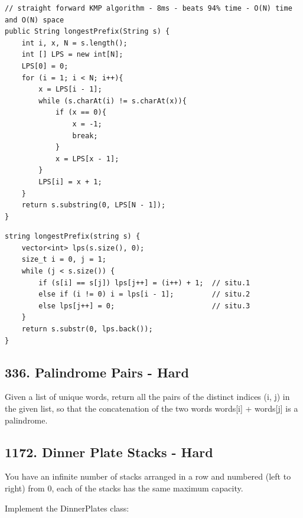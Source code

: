 \documentclass[9pt, b5paaper]{book}
\begin{document}
\begin{enumerate}
\begin{verbatim}
// straight forward KMP algorithm - 8ms - beats 94% time - O(N) time and O(N) space
public String longestPrefix(String s) {
    int i, x, N = s.length();
    int [] LPS = new int[N];
    LPS[0] = 0;
    for (i = 1; i < N; i++){
        x = LPS[i - 1];
        while (s.charAt(i) != s.charAt(x)){
            if (x == 0){
                x = -1;
                break;
            }
            x = LPS[x - 1];
        }
        LPS[i] = x + 1;
    }
    return s.substring(0, LPS[N - 1]);
}
\end{verbatim}
\begin{verbatim}
string longestPrefix(string s) {
    vector<int> lps(s.size(), 0);
    size_t i = 0, j = 1;
    while (j < s.size()) {
        if (s[i] == s[j]) lps[j++] = (i++) + 1;  // situ.1
        else if (i != 0) i = lps[i - 1];         // situ.2
        else lps[j++] = 0;                       // situ.3
    }
    return s.substr(0, lps.back());
}
\end{verbatim}
\end{enumerate}
\subsection{336. Palindrome Pairs - Hard}
\label{sec-7-0-3}
Given a list of unique words, return all the pairs of the distinct indices (i, j) in the given list, so that the concatenation of the two words words[i] + words[j] is a palindrome.
\subsection{1172. Dinner Plate Stacks - Hard}
\label{sec-7-0-4}
You have an infinite number of stacks arranged in a row and numbered (left to right) from 0, each of the stacks has the same maximum capacity.

Implement the DinnerPlates class:
\end{document}
